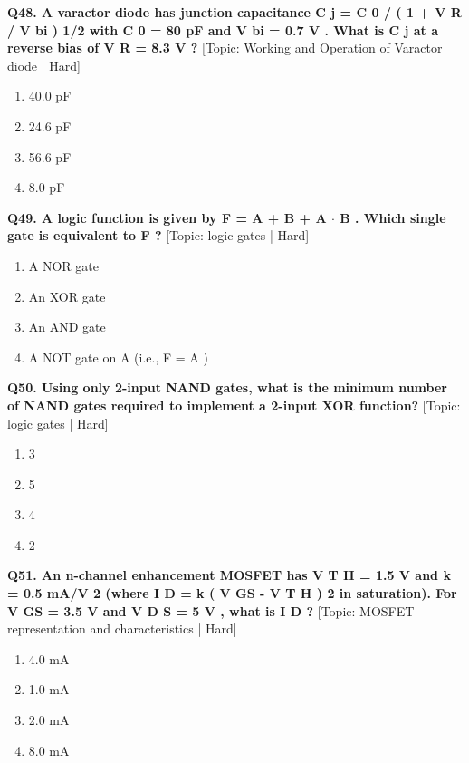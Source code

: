 \noindent\textbf{Q48. A varactor diode has junction capacitance C j = C 0 / ( 1 + V R / V bi ) 1/2 with C 0 = 80 pF and V bi = 0.7 V . What is C j at a reverse bias of V R = 8.3 V ?} \hfill [Topic: Working and Operation of Varactor diode | Hard]
\begin{enumerate}[label=(\alph*),topsep=2pt,itemsep=1pt,partopsep=0pt,parsep=0pt]
    \item {40.0 pF}
    \item {24.6 pF}
    \item {56.6 pF}
    \item {8.0 pF}
\end{enumerate}
\vspace{2mm}

\noindent\textbf{Q49. A logic function is given by F = A + B + A $\cdot$ B . Which single gate is equivalent to F ?} \hfill [Topic: logic gates | Hard]
\begin{enumerate}[label=(\alph*),topsep=2pt,itemsep=1pt,partopsep=0pt,parsep=0pt]
    \item {A NOR gate}
    \item {An XOR gate}
    \item {An AND gate}
    \item {A NOT gate on A (i.e., F = A )}
\end{enumerate}
\vspace{2mm}

\noindent\textbf{Q50. Using only 2-input NAND gates, what is the minimum number of NAND gates required to implement a 2-input XOR function?} \hfill [Topic: logic gates | Hard]
\begin{enumerate}[label=(\alph*),topsep=2pt,itemsep=1pt,partopsep=0pt,parsep=0pt]
    \item {3}
    \item {5}
    \item {4}
    \item {2}
\end{enumerate}
\vspace{2mm}

\noindent\textbf{Q51. An n-channel enhancement MOSFET has V T H = 1.5 V and k = 0.5 mA/V 2 (where I D = k ( V GS - V T H ) 2 in saturation). For V GS = 3.5 V and V D S = 5 V , what is I D ?} \hfill [Topic: MOSFET representation and characteristics | Hard]
\begin{enumerate}[label=(\alph*),topsep=2pt,itemsep=1pt,partopsep=0pt,parsep=0pt]
    \item {4.0 mA}
    \item {1.0 mA}
    \item {2.0 mA}
    \item {8.0 mA}
\end{enumerate}
\vspace{2mm}

